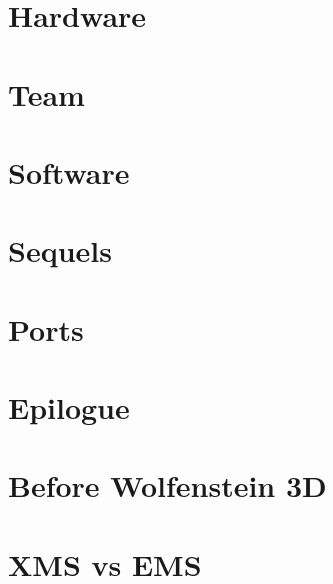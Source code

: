 \documentclass[8pt]{book}
\begin{document}
  
    \chapter{Hardware}
      

  
    \chapter{Team}
      
      
    \chapter{Software}
       
       
      
       
       
      
       
    
  
           


\chapter{Sequels}
        
        

    \chapter{Ports}        
        
        
    
       \chapter{Epilogue}
        

        \appendix
    \appendixpage

\chapter{Before Wolfenstein 3D}
        
    
    \chapter{XMS vs EMS} 
          
\end{document}
